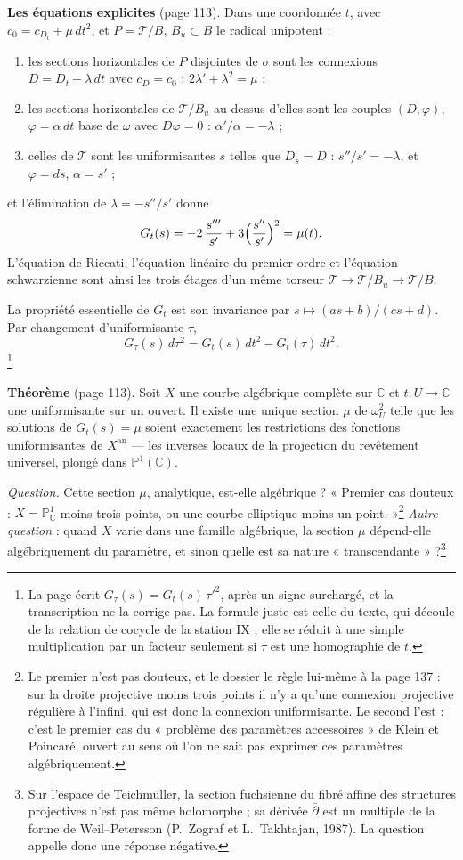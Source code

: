 \documentclass[11pt,a4paper]{article}
\begin{document}
\textbf{Les équations explicites} (page 113). Dans une coordonnée $t$, avec
$c_0 = c_{D_t} + \mu\,dt^2$, et $P = \mathcal{T}/B$, $B_u \subset B$ le
radical unipotent :
\begin{enumerate}
  \item[a)] les sections horizontales de $P$ disjointes de $\sigma$ sont les
  connexions $D = D_t + \lambda\,dt$ avec $c_D = c_0$ : $2\lambda' + \lambda^2 = \mu$ ;
  \item[b)] les sections horizontales de $\mathcal{T}/B_u$ au-dessus d'elles
  sont les couples $(D, \varphi)$, $\varphi = \alpha\,dt$ base de $\omega$ avec
  $D\varphi = 0$ : $\alpha'/\alpha = -\lambda$ ;
  \item[c)] celles de $\mathcal{T}$ sont les uniformisantes $s$ telles que
  $D_s = D$ : $s''/s' = -\lambda$, et $\varphi = ds$, $\alpha = s'$ ;
\end{enumerate}
et l'élimination de $\lambda = -s''/s'$ donne
\[
  G_t(s) = -2\,\frac{s'''}{s'} + 3\Bigl(\frac{s''}{s'}\Bigr)^2 = \mu(t) .
\]
L'équation de Riccati, l'équation linéaire du premier ordre et l'équation
schwarzienne sont ainsi les trois étages d'un même torseur
$\mathcal{T} \to \mathcal{T}/B_u \to \mathcal{T}/B$.

La propriété essentielle de $G_t$ est son invariance par
$s \mapsto (as + b)/(cs + d)$. Par changement d'uniformisante $\tau$,
\[
  G_\tau(s)\,d\tau^2 = G_t(s)\,dt^2 - G_t(\tau)\,dt^2 .
\]
\footnote{La page écrit $G_\tau(s) = G_t(s)\,\tau'^2$, après un signe surchargé,
et la transcription ne la corrige pas. La formule juste est celle du texte,
qui découle de la relation de cocycle de la station IX ; elle se réduit à
une simple multiplication par un facteur seulement si $\tau$ est une
homographie de $t$.}

\textbf{Théorème} (page 113). Soit $X$ une courbe algébrique complète sur
$\mathbb{C}$ et $t : U \to \mathbb{C}$ une uniformisante sur un ouvert. Il existe
une unique section $\mu$ de $\omega_U^2$ telle que les solutions de
$G_t(s) = \mu$ soient exactement les restrictions des fonctions
uniformisantes de $X^{\mathrm{an}}$ — les inverses locaux de la projection du
revêtement universel, plongé dans $\mathbb{P}^1(\mathbb{C})$.

\emph{Question.} Cette section $\mu$, analytique, est-elle algébrique ? « Premier
cas douteux : $X = \mathbb{P}^1_{\mathbb{C}}$ moins trois points, ou une courbe
elliptique moins un point. »\footnote{Le premier n'est pas douteux, et le
dossier le règle lui-même à la page 137 : sur la droite projective moins
trois points il n'y a qu'une connexion projective régulière à l'infini, qui
est donc la connexion uniformisante. Le second l'est : c'est le premier cas
du « problème des paramètres accessoires » de Klein et Poincaré, ouvert au
sens où l'on ne sait pas exprimer ces paramètres algébriquement.} \emph{Autre
question} : quand $X$ varie dans une famille algébrique, la section $\mu$
dépend-elle algébriquement du paramètre, et sinon quelle est sa nature
« transcendante » ?\footnote{Sur l'espace de Teichmüller, la section
fuchsienne du fibré affine des structures projectives n'est pas même
holomorphe ; sa dérivée $\bar\partial$ est un multiple de la forme de
Weil--Petersson (P.~Zograf et L.~Takhtajan, 1987). La question appelle donc
une réponse négative.}
\end{document}
